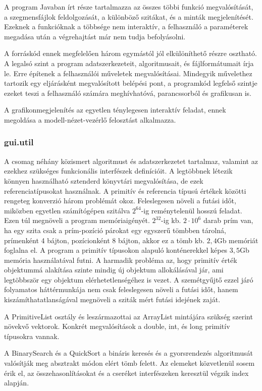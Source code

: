 A program Javaban írt része tartalmazza az összes többi funkció megvalósítását, a szegmensfájlok feldolgozását, a különböző szitákat, és a minták megjelenítését.
Ezeknek a funkcióknak a többsége nem interaktív, a felhasználó a paraméterek megadása után a végrehajtást már nem tudja befolyásolni.

A forráskód ennek megfelelően három egymástól jól elkülöníthető részre osztható.
A legalsó szint a program adatszerkezeteit, algoritmusait, és fájlformátumait írja le. 
Erre építenek a felhasználói műveletek megvalósításai.
Mindegyik művelethez tartozik egy eljárásként megvalósított belépési pont,
a programkód legfelső szintje ezeket teszi a felhasználó számára meghívhatóvá, parancssorból és grafikusan is.

A grafikonmegjelenítés az egyetlen ténylegesen interaktív feladat, ennek megoldása a modell-nézet-vezérlő felosztást alkalmazza.

\subsubsection{gui.util}

A csomag néhány közismert algoritmust és adatszerkezetet tartalmaz, valamint az ezekhez szükséges funkcionális interfészek definícióit.
A legtöbbnek létezik könnyen használható sztenderd könyvtári megvalósítása, de ezek referenciatípusokat használnak.
A primitív és referencia típusú értékek közötti rengeteg konverzió három problémát okoz.
Feleslegesen növeli a futási időt, miközben egyetlen számítógépen szitálva $2^{64}$-ig reménytelenül hosszú feladat.
Ezen túl megnöveli a program memóriaigényét.
$2^{32}$-ig kb. $2\cdot10^6$ darab prím van, ha egy szita csak a prím-pozíció párokat egy egyszerű tömbben tárolná, prímenként 4 bájton, pozícionként 8 bájton, akkor ez a tömb kb. $2,4$Gb memóriát foglalna el.
A program a primitív típusokon alapuló konténerekkel képes $3,5$Gb memória használatával futni.
A harmadik probléma az, hogy primitív érték objektummá alakítása szinte mindig új objektum allokálásával jár, ami legtöbbször egy objektum elérhetetlenségéhez is vezet.
A szemétgyűjtő ezzel járó folyamatos háttérmunkája nem csak feleslegesen növeli a futási időt, hanem kiszámíthatatlanságával megnöveli a sziták mért futási idejének zaját.

A PrimitiveList osztály és leszármazottai az ArrayList mintájára szükség szerint növekvő vektorok. Konkrét megvalósítások a double, int, és long primitív típusokra vannak.

A BinarySearch és a QuickSort a bináris keresés és a gyorsrendezés algoritmusát valósítják meg absztrakt módon elért tömb felett. Az elemeket közvetlenül sosem érik el, az összehasonlításokat és a cseréket interfészeken keresztül végzik index alapján.

